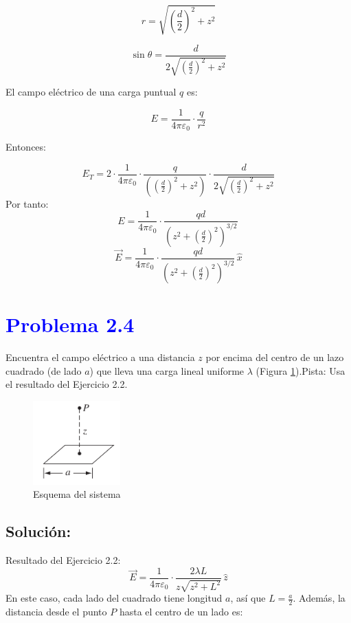 \documentclass[12pt]{article}
\newcommand{\question}[1]{\textcolor{blue}{\textbf{#1}}}
\begin{document}
\[
r = \sqrt{\left( \frac{d}{2} \right)^2 + z^2}
\]

\[
\sin \theta = \frac{d}{2 \sqrt{\left( \frac{d}{2} \right)^2 + z^2}}
\]

El campo eléctrico de una carga puntual \( q \) es:

\[
E = \frac{1}{4\pi \varepsilon_0} \cdot \frac{q}{r^2}
\]

Entonces:

\[
E_T = 2 \cdot \frac{1}{4\pi \varepsilon_0} \cdot \frac{q}{\left( \left( \frac{d}{2} \right)^2 + z^2 \right)} \cdot \frac{d}{2 \sqrt{\left( \frac{d}{2} \right)^2 + z^2}}
\]
Por tanto: 
\[
\boxed{
{E} = \frac{1}{4\pi\varepsilon_0} \cdot \frac{qd}{\left(z^2 + \left(\frac{d}{2}\right)^2\right)^{3/2}} \,
}
\]
\[
\boxed{
\vec{E} = \frac{1}{4\pi\varepsilon_0} \cdot \frac{qd}{\left(z^2 + \left(\frac{d}{2}\right)^2\right)^{3/2}} \, \hat{x}
}
\]

\section*{\question{Problema 2.4} }Encuentra el campo eléctrico a una distancia \( z \) por encima del centro de un lazo cuadrado (de lado \( a \)) que lleva una carga lineal uniforme \( \lambda \) (Figura \ref{Esquema2}).Pista: Usa el resultado del Ejercicio 2.2.

\begin{figure}[ht] 
    \centering
    \includegraphics[width=0.3\textwidth]{imagenes/eje2.4.png} 
    \caption{Esquema del sistema}
    \label{Esquema2}
\end{figure}

\subsection*{Solución:}
Resultado del Ejercicio 2.2:
\[
\vec{E} = \frac{1}{4\pi\varepsilon_0} \cdot \frac{2\lambda L}{z \sqrt{z^2 + L^2}} \, \hat{z}
\]
En este  caso, cada lado del cuadrado tiene longitud $a$, así que $L = \frac{a}{2}$. Además, la distancia desde el punto $P$ hasta el centro de un lado es:
\end{document}
